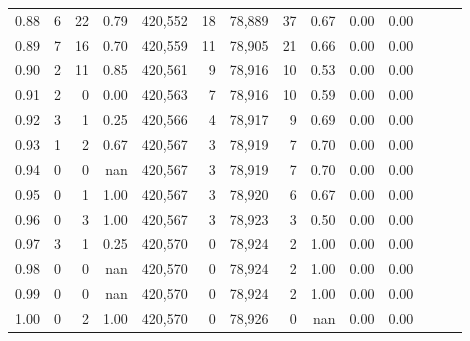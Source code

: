 \begin{tabular}{rrrrrrrrrrrrrr}
0.88 &       6 &     22 &  0.79 &  420,552 &       18 &  78,889 &      37 &  0.67 &  0.00 &      0.00 \\
0.89 &       7 &     16 &  0.70 &  420,559 &       11 &  78,905 &      21 &  0.66 &  0.00 &      0.00 \\
0.90 &       2 &     11 &  0.85 &  420,561 &        9 &  78,916 &      10 &  0.53 &  0.00 &      0.00 \\
0.91 &       2 &      0 &  0.00 &  420,563 &        7 &  78,916 &      10 &  0.59 &  0.00 &      0.00 \\
0.92 &       3 &      1 &  0.25 &  420,566 &        4 &  78,917 &       9 &  0.69 &  0.00 &      0.00 \\
0.93 &       1 &      2 &  0.67 &  420,567 &        3 &  78,919 &       7 &  0.70 &  0.00 &      0.00 \\
0.94 &       0 &      0 &   nan &  420,567 &        3 &  78,919 &       7 &  0.70 &  0.00 &      0.00 \\
0.95 &       0 &      1 &  1.00 &  420,567 &        3 &  78,920 &       6 &  0.67 &  0.00 &      0.00 \\
0.96 &       0 &      3 &  1.00 &  420,567 &        3 &  78,923 &       3 &  0.50 &  0.00 &      0.00 \\
0.97 &       3 &      1 &  0.25 &  420,570 &        0 &  78,924 &       2 &  1.00 &  0.00 &      0.00 \\
0.98 &       0 &      0 &   nan &  420,570 &        0 &  78,924 &       2 &  1.00 &  0.00 &      0.00 \\
0.99 &       0 &      0 &   nan &  420,570 &        0 &  78,924 &       2 &  1.00 &  0.00 &      0.00 \\
1.00 &       0 &      2 &  1.00 &  420,570 &        0 &  78,926 &       0 &   nan &  0.00 &      0.00 \\
\bottomrule
\end{tabular}
